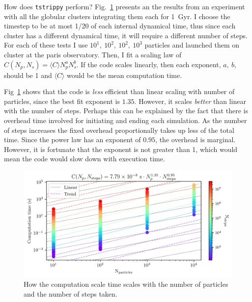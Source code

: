         How does \texttt{tstrippy} perform? Fig.~\ref{fig:NumericalErrorComputationTimeScalingForStreams} presents an the results from an experiment with all the globular clusters integrating them each for 1~Gyr. I choose the timestep to be at most 1/20 of each internal dynamical time, thus since each cluster has a different dynamical time, it will require a different number of steps. For each of these tests I use $10^1,~10^2,~10^2,~10^3$ particles and launched them on cluster at the paris observatory. Then, I fit a scaling law of $C(N_p,N_s) = \langle C\rangle N_p^a N_s^b$. If the code scales linearly, then each exponent, $a,~b$, should be 1 and $\langle C\rangle$ would be the mean computation time. 
        
        Fig~\ref{fig:NumericalErrorComputationTimeScalingForStreams} shows that the code is \textit{less} efficient than linear scaling with number of particles, since the best fit exponent is $1.35$. However, it scales \textit{better} than linear with the number of steps. Perhaps this can be explained by the fact that there is overhead time involved for initiating and ending each simulation. As the number of steps increases the fixed overhead proportionally takes up less of the total time. Since the power law has an exponent of $0.95$, the overhead is marginal. However, it is fortunate that the exponent is not greater than 1, which would mean the code would slow down with execution time. 
        \begin{figure}
            \centering
            \includegraphics[width=\linewidth]{images/NumericalErrorComputationTimeScalingForStreams.png}
            \caption{How the computation scale time scales with the number of particles and the number of steps taken.}
            \label{fig:NumericalErrorComputationTimeScalingForStreams}
        \end{figure}
